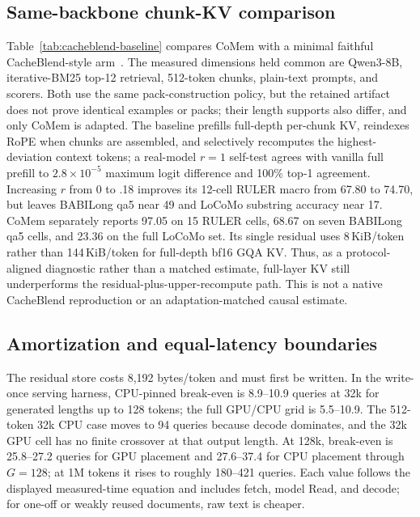 \subsection{Same-backbone chunk-KV comparison}


Table~\ref{tab:cacheblend-baseline} compares CoMem with a minimal faithful
CacheBlend-style arm~\citep{cacheblend}. The measured dimensions held common
are Qwen3-8B, iterative-BM25 top-12 retrieval, 512-token chunks, plain-text
prompts, and scorers. Both use the same pack-construction policy, but the
retained artifact does not prove identical examples or packs; their length
supports also differ, and only CoMem is adapted. The baseline prefills
full-depth per-chunk KV, reindexes
RoPE when chunks are assembled, and selectively recomputes the highest-deviation
context tokens; a real-model $r{=}1$ self-test agrees with vanilla full prefill
to $2.8\!\times\!10^{-5}$ maximum logit difference and 100\% top-1 agreement.
Increasing $r$ from 0 to .18 improves its 12-cell RULER macro from 67.80 to
74.70, but leaves BABILong qa5 near 49 and LoCoMo substring accuracy near 17.
CoMem separately reports 97.05 on 15 RULER cells, 68.67 on seven BABILong qa5
cells, and 23.36 on the full LoCoMo set. Its single residual
uses 8\,KiB/token rather than 144\,KiB/token for full-depth bf16 GQA KV. Thus,
as a protocol-aligned diagnostic rather than a matched estimate, full-layer KV
still underperforms the residual-plus-upper-recompute path. This is not a native
CacheBlend reproduction or an adaptation-matched causal estimate.

\subsection{Amortization and equal-latency boundaries}


The residual store costs 8,192 bytes/token and must first be written. In the
write-once serving harness, CPU-pinned break-even is 8.9--10.9 queries at 32k
for generated lengths up to 128 tokens; the full GPU/CPU grid is 5.5--10.9.
The 512-token 32k CPU case moves to 94 queries because decode dominates, and
the 32k GPU cell has no finite crossover at that output length. At 128k,
break-even is 25.8--27.2 queries for GPU placement and 27.6--37.4 for CPU
placement through $G{=}128$; at 1M tokens it rises to roughly 180--421 queries.
Each value follows the displayed measured-time equation and includes fetch,
model Read, and decode; for one-off or weakly reused documents, raw text is
cheaper.

